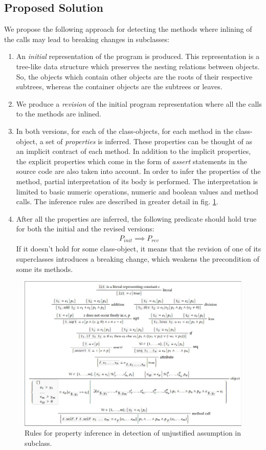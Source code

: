 \subsection{Proposed Solution}
We propose the following approach for detecting the methods where inlining of the calls may lead to breaking changes in subclasses:
\begin{enumerate}
    \item An \textit{initial} representation of the program is produced. This representation is a tree-like data structure which preserves the nesting relations between objects. So, the objects which contain other objects are the roots of their respective subtrees, whereas the container objects are the subtrees or leaves.
    \item We produce a \textit{revision} of the initial program representation where all the calls to the methods are inlined. 
    \item In both versions, for each of the class-objects, for each method in the class-object, a set of \textit{properties} is inferred.  These properties can be thought of as an implicit contract \cite{meyer} of each method. In addition to the implicit properties, the explicit properties which come in the form of \textit{assert} statements in the source code are also taken into account. In order to infer the properties of the method, partial interpretation of its body is performed. The interpretation is limited to basic numeric operations, numeric and boolean values and method calls. The inference rules are described in greater detail in fig. \ref{fig:props}.
    \item After all the properties are inferred, the following predicate should hold true for both the initial and the revised versions:
    \begin{align*}
        P_{init} \implies P_{rev}
    \end{align*}
    If it doesn't hold for some class-object, it means that the revision of one of its superclasses introduces a breaking change, which weakens the precondition of some its methods. 
\end{enumerate}

\begin{figure}
    \includegraphics[width=\textwidth]{figs/properties}
    \caption{Rules for property inference in detection of unjustified assumption in subclass.}
    \label{fig:props}
\end{figure}

